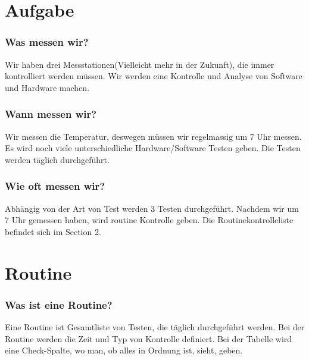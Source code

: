 \section{Aufgabe}
		\subsubsection{Was messen wir?}
		Wir haben drei Messstationen(Vielleicht mehr in der Zukunft), die immer kontrolliert werden müssen.
		Wir werden eine Kontrolle und Analyse von Software und Hardware machen. 
		\subsubsection{Wann messen wir?}
		Wir messen die Temperatur, deswegen müssen wir regelmassig  um 7 Uhr messen. Es wird noch viele unterschiedliche Hardware/Software Testen geben. Die Testen werden täglich durchgeführt.
		\subsubsection{Wie oft messen wir?}
		Abhängig von der Art von Test werden 3 Testen durchgeführt. Nachdem wir um 7 Uhr gemessen haben, wird routine Kontrolle geben. Die Routinekontrolleliste befindet sich im Section 2.
		\newpage 
\section{Routine}
		\subsubsection{Was ist eine Routine?}
		Eine Routine ist Gesamtliste von Testen, die täglich durchgeführt werden. Bei der Routine werden die Zeit und Typ von Kontrolle definiert. Bei der Tabelle wird eine Check-Spalte, wo man, ob alles in Ordnung ist, sieht, geben. 
